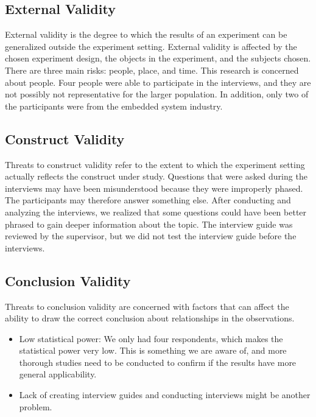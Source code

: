 \subsection{External Validity}
External validity is the degree to which the results of an experiment can be generalized outside the experiment setting. External validity is affected by the chosen experiment design, the objects in the experiment, and the subjects chosen. There are three main risks: people, place, and time. This research is concerned about people. Four people were able to participate in the interviews, and they are not possibly not representative for the larger population. In addition, only two of the participants were from the embedded system industry. 

\subsection{Construct Validity}
Threats to construct validity refer to the extent to which the experiment setting actually reflects the construct under study. Questions that were asked during the interviews may have been misunderstood because they were improperly phased. The participants may therefore answer something else. After conducting and analyzing the interviews, we realized that some questions could have been better phrased to gain deeper information about the topic. The interview guide was reviewed by the supervisor, but we did not test the interview guide before the interviews.

\subsection{Conclusion Validity}
Threats to conclusion validity are concerned with factors that can affect the ability to draw the correct conclusion about relationships in the observations\cite{Wohlin:2000:ESE:330775}. 

\begin{itemize}
\item Low statistical power: We only had four respondents, which makes the statistical power very low. This is something we are aware of, and more thorough studies need to be conducted to confirm if the results have more general applicability.

\item Lack of creating interview guides and conducting interviews might be another problem.
\end{itemize}




